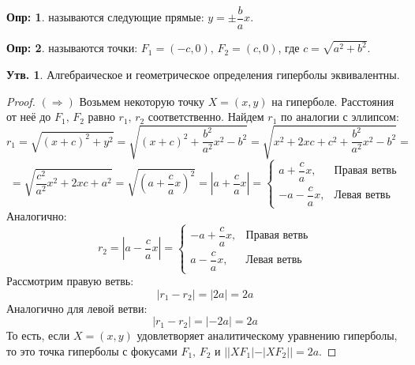 \documentclass[12pt]{article}
\theoremstyle{definition}
\newtheorem{defn}{Опр:}
\newtheorem{prop}{Утв.}
\begin{document}
\begin{defn}
	 называются следующие прямые: $y = \pm \dfrac{b}{a}x$.
\end{defn}
\begin{defn}
	 называются точки: $F_1 = (-c,0), \, F_2 = (c,0)$, где $c = \sqrt{a^2 + b^2}$.
\end{defn}
\begin{prop}
	Алгебраическое и геометрическое определения гиперболы эквивалентны.
\end{prop}
\begin{proof}\hfill
	
	$(\Rightarrow)$ Возьмем некоторую точку $X = (x,y)$ на гиперболе. Расстояния от неё до $F_1, \, F_2$ равно $r_1, \, r_2$ соответственно. Найдем $r_1$ по аналогии с эллипсом:
	$$
		r_1 = \sqrt{(x + c)^2 + y^2} = \sqrt{(x+c)^2 +  \dfrac{b^2}{a^2}x^2 - b^2} = \sqrt{x^2 + 2xc + c^2 +  \dfrac{b^2}{a^2}x^2 - b^2 } = 
	$$
	$$
		=\sqrt{\dfrac{c^2}{a^2}x^2 + 2xc + a^2} = \sqrt{\left(a + \dfrac{c}{a}x\right)^2} = \left|a + \dfrac{c}{a}x \right| = 
		\begin{cases}
			a + \dfrac{c}{a}x, & \text{Правая ветвь}\\[8pt]
			-a-\dfrac{c}{a}x, & \text{Левая ветвь}
		\end{cases}
	$$
	Аналогично:
	$$
		r_2 = \left| a - \dfrac{c}{a}x\right| = 
		\begin{cases}
			- a + \dfrac{c}{a}x, & \text{Правая ветвь}\\[8pt]
			a-\dfrac{c}{a}x, & \text{Левая ветвь}
		\end{cases}
	$$
	Рассмотрим правую ветвь:
	$$
		|r_1 - r_2| = |2a| = 2a
	$$
	Аналогично для левой ветви:
	$$
		|r_1 - r_2| = |-2a| = 2a
	$$
	То есть, если $X = (x,y)$ удовлетворяет аналитическому уравнению гиперболы, то это точка гиперболы с фокусами $F_1, \, F_2$ и $||XF_1| - |XF_2|| = 2a$.
	

\end{proof}
\end{document}

